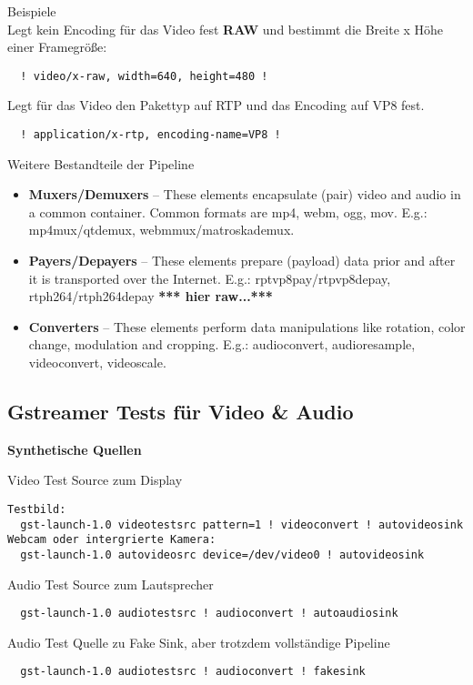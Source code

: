 Beispiele\\
Legt kein Encoding für das Video fest \textbf{RAW} und bestimmt die Breite x Höhe einer Framegröße:
\begin{verbatim}
  ! video/x-raw, width=640, height=480 !
\end{verbatim}
Legt für das Video den Pakettyp auf RTP und das Encoding auf VP8 fest.
\begin{verbatim}
  ! application/x-rtp, encoding-name=VP8 !
\end{verbatim}

Weitere Bestandteile der Pipeline
\begin{itemize}
\item \textbf{Muxers/Demuxers} – These elements encapsulate (pair) video and audio in a common container. Common formats are mp4, webm, ogg, mov.
E.g.:  mp4mux/qtdemux, webmmux/matroskademux.
\item \textbf{Payers/Depayers} – These elements prepare (payload) data prior and after it is transported over the Internet.
E.g.: rptvp8pay/rtpvp8depay,  rtph264/rtph264depay \textbf{*** hier raw...***}
\item \textbf{Converters} – These elements perform data manipulations like rotation, color change, modulation and cropping.
E.g.: audioconvert, audioresample, videoconvert, videoscale.
\end{itemize}
\color{black}
\subsection{Gstreamer Tests für Video \& Audio}

\textbf{Synthetische Quellen}

Video Test Source zum Display
\begin{verbatim}
Testbild:
  gst-launch-1.0 videotestsrc pattern=1 ! videoconvert ! autovideosink
Webcam oder intergrierte Kamera: 
  gst-launch-1.0 autovideosrc device=/dev/video0 ! autovideosink
\end{verbatim}

Audio Test Source zum Lautsprecher
\begin{verbatim}
  gst-launch-1.0 audiotestsrc ! audioconvert ! autoaudiosink
\end{verbatim}

Audio Test Quelle zu Fake Sink, aber trotzdem vollständige Pipeline
\begin{verbatim}
  gst-launch-1.0 audiotestsrc ! audioconvert ! fakesink
\end{verbatim}

